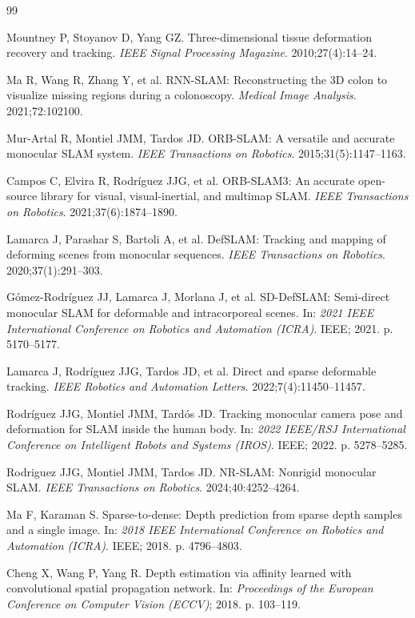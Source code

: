 \documentclass[pdflatex,sn-mathphys-num]{sn-jnl}
\begin{document}
\begin{thebibliography}{99}

Mountney P, Stoyanov D, Yang GZ. Three-dimensional tissue deformation recovery and tracking. \textit{IEEE Signal Processing Magazine}. 2010;27(4):14--24.

Ma R, Wang R, Zhang Y, et al. RNN-SLAM: Reconstructing the 3D colon to visualize missing regions during a colonoscopy. \textit{Medical Image Analysis}. 2021;72:102100.

Mur-Artal R, Montiel JMM, Tardos JD. ORB-SLAM: A versatile and accurate monocular SLAM system. \textit{IEEE Transactions on Robotics}. 2015;31(5):1147--1163.

Campos C, Elvira R, Rodr\'{i}guez JJG, et al. ORB-SLAM3: An accurate open-source library for visual, visual-inertial, and multimap SLAM. \textit{IEEE Transactions on Robotics}. 2021;37(6):1874--1890.

Lamarca J, Parashar S, Bartoli A, et al. DefSLAM: Tracking and mapping of deforming scenes from monocular sequences. \textit{IEEE Transactions on Robotics}. 2020;37(1):291--303.

G\'{o}mez-Rodr\'{i}guez JJ, Lamarca J, Morlana J, et al. SD-DefSLAM: Semi-direct monocular SLAM for deformable and intracorporeal scenes. In: \textit{2021 IEEE International Conference on Robotics and Automation (ICRA)}. IEEE; 2021. p. 5170--5177.

Lamarca J, Rodr\'{i}guez JJG, Tardos JD, et al. Direct and sparse deformable tracking. \textit{IEEE Robotics and Automation Letters}. 2022;7(4):11450--11457.

Rodr\'{i}guez JJG, Montiel JMM, Tard\'{o}s JD. Tracking monocular camera pose and deformation for SLAM inside the human body. In: \textit{2022 IEEE/RSJ International Conference on Intelligent Robots and Systems (IROS)}. IEEE; 2022. p. 5278--5285.

Rodriguez JJG, Montiel JMM, Tardos JD. NR-SLAM: Nonrigid monocular SLAM. \textit{IEEE Transactions on Robotics}. 2024;40:4252--4264.

Ma F, Karaman S. Sparse-to-dense: Depth prediction from sparse depth samples and a single image. In: \textit{2018 IEEE International Conference on Robotics and Automation (ICRA)}. IEEE; 2018. p. 4796--4803.

Cheng X, Wang P, Yang R. Depth estimation via affinity learned with convolutional spatial propagation network. In: \textit{Proceedings of the European Conference on Computer Vision (ECCV)}; 2018. p. 103--119.


\end{thebibliography}
\end{document}
